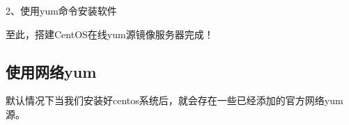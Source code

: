 \documentclass[letterpaper,10pt,english]{sphinxmanual}
\begin{document}
2、使用yum命令安装软件

%
\begin{sphinxVerbatim}[commandchars=\\\{\}]
   
   
   
\end{sphinxVerbatim}

至此，搭建CentOS在线yum源镜像服务器完成！


\subsection{使用网络yum}
\label{\detokenize{software_manage/yum/yum_http:yum}}\label{\detokenize{software_manage/yum/yum_http::doc}}
默认情况下当我们安装好centos系统后，就会存在一些已经添加的官方网络yum源。
\end{document}

